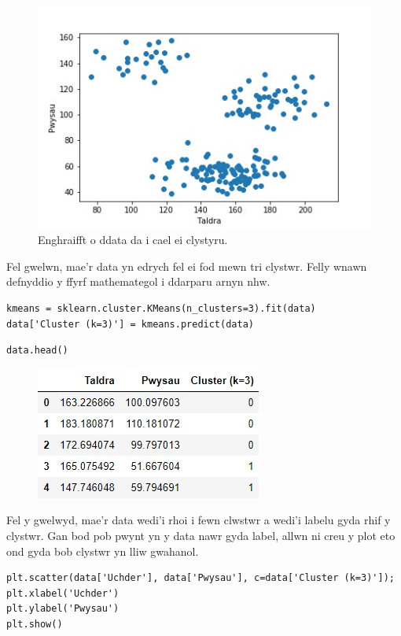\begin{figure}[h!]
\begin{center}
\includegraphics[width=0.7\linewidth]{../img/Scatterpython.jpeg}
\caption{Enghraifft o ddata da i cael ei clystyru.}
\label{fig:Scatterpython}
\end{center}
\end{figure}

Fel gwelwn, mae'r data yn edrych fel ei fod mewn tri clystwr. Felly wnawn defnyddio y ffyrf mathemategol i ddarparu arnyn nhw.

\begin{verbatim}
kmeans = sklearn.cluster.KMeans(n_clusters=3).fit(data)
data['Cluster (k=3)'] = kmeans.predict(data)
\end{verbatim}



\begin{verbatim}
data.head()
\end{verbatim}

\begin{figure}[h!]
\includegraphics[width=0.35\linewidth]{../img/tabl2.jpg}
\label{fig:Data2}
\end{figure}

Fel y gwelwyd, mae'r data wedi'i rhoi i fewn clwstwr a wedi'i labelu gyda rhif y clystwr. Gan bod pob pwynt yn y data nawr gyda label, allwn ni creu y plot eto ond gyda bob clystwr yn lliw gwahanol.

\begin{verbatim}
plt.scatter(data['Uchder'], data['Pwysau'], c=data['Cluster (k=3)']);
plt.xlabel('Uchder')
plt.ylabel('Pwysau')
plt.show()
\end{verbatim}

